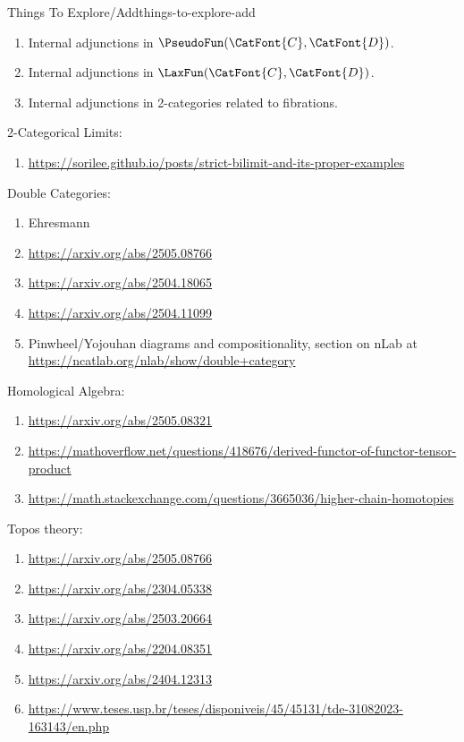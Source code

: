 \begin{remark}{Things To Explore/Add}{things-to-explore-add}
\begin{enumerate}
\begin{enumerate}
                \item Internal adjunctions in $\PseudoFun(\CatFont{C},\CatFont{D})$.
                \item Internal adjunctions in $\LaxFun(\CatFont{C},\CatFont{D})$.
                \item Internal adjunctions in 2-categories related to fibrations.
            \end{enumerate}
    \end{enumerate}
    2-Categorical Limits:
    \begin{enumerate}
        \item \url{https://sorilee.github.io/posts/strict-bilimit-and-its-proper-examples}
    \end{enumerate}
    Double Categories:
    \begin{enumerate}
        \item Ehresmann
        \item \url{https://arxiv.org/abs/2505.08766}
        \item \url{https://arxiv.org/abs/2504.18065}
        \item \url{https://arxiv.org/abs/2504.11099}
        \item Pinwheel/Yojouhan diagrams and compositionality, section on nLab at \url{https://ncatlab.org/nlab/show/double+category}
    \end{enumerate}
    Homological Algebra:
    \begin{enumerate}
        \item \url{https://arxiv.org/abs/2505.08321}
        \item \url{https://mathoverflow.net/questions/418676/derived-functor-of-functor-tensor-product}
        \item \url{https://math.stackexchange.com/questions/3665036/higher-chain-homotopies}
    \end{enumerate}
    Topos theory:
    \begin{enumerate}
        \item \url{https://arxiv.org/abs/2505.08766}
        \item \url{https://arxiv.org/abs/2304.05338}
        \item \url{https://arxiv.org/abs/2503.20664}
        \item \url{https://arxiv.org/abs/2204.08351}
        \item \url{https://arxiv.org/abs/2404.12313}
        \item \url{https://www.teses.usp.br/teses/disponiveis/45/45131/tde-31082023-163143/en.php}

\end{enumerate}
\end{remark}
